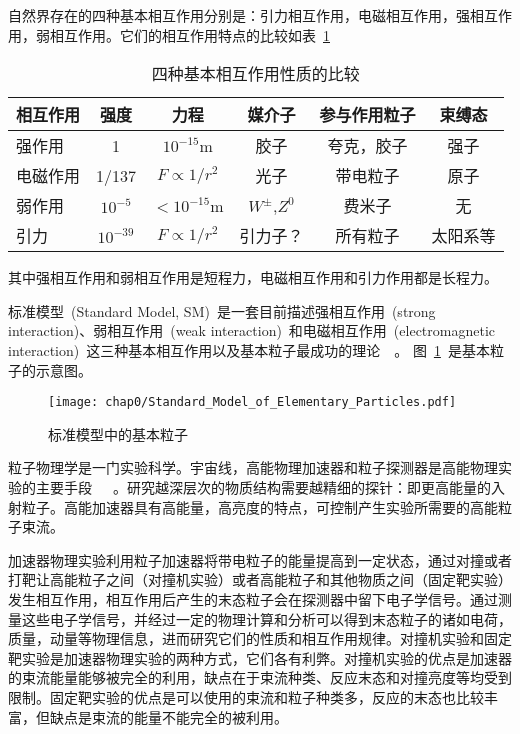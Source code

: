 自然界存在的四种基本相互作用分别是：引力相互作用，电磁相互作用，强相互作用，弱相互作用。它们的相互作用特点的比较如表~\ref{tbl:interaction}~

\begin{table}[h]
    \centering
    \caption{\label{tbl:interaction} 四种基本相互作用性质的比较}
    \footnotesize
    \begin{tabular}{lccccc}
        \hline
        相互作用& 强度& 力程& 媒介子& 参与作用粒子& 束缚态 \\
        \hline
        强作用& 1& $10^{-15}$m& 胶子& 夸克，胶子& 强子 \\
        电磁作用& 1/137& $F \propto 1/r^{2}$& 光子& 带电粒子& 原子 \\
        弱作用& $10^{-5}$& $<10^{-15}$m& $W^{\pm}$,$Z^{0}$& 费米子& 无 \\
        引力& $10^{-39}$&  $F \propto 1/r^{2}$& 引力子？& 所有粒子& 太阳系等\\
        \hline
    \end{tabular}
\end{table}

其中强相互作用和弱相互作用是短程力，电磁相互作用和引力作用都是长程力。


标准模型~(Standard Model, SM)~是一套目前描述强相互作用~(strong interaction)、弱相互作用~(weak interaction)~和电磁相互作用~(electromagnetic interaction)~这三种基本相互作用以及基本粒子最成功的理论~\cite{duds2015}~\cite{S.Weinberg:1967}。
图~\ref{fig:standard_model_particle}~是基本粒子的示意图。
\begin{figure}[!h]
  \centering
  \texttt{[image: chap0/Standard\_Model\_of\_Elementary\_Particles.pdf]}
  \caption{标准模型中的基本粒子}
  \label{fig:standard_model_particle}
\end{figure}

粒子物理学是一门实验科学。宇宙线，高能物理加速器和粒子探测器是高能物理实验的主要手段~\cite{tangxw1982}~\cite{xukz1981}~\cite{xieyg2003}\cite{xuefj2003}。研究越深层次的物质结构需要越精细的探针：即更高能量的入射粒子。高能加速器具有高能量，高亮度的特点，可控制产生实验所需要的高能粒子束流。

加速器物理实验利用粒子加速器将带电粒子的能量提高到一定状态，通过对撞或者打靶让高能粒子之间（对撞机实验）或者高能粒子和其他物质之间（固定靶实验）发生相互作用，相互作用后产生的末态粒子会在探测器中留下电子学信号。通过测量这些电子学信号，并经过一定的物理计算和分析可以得到末态粒子的诸如电荷，质量，动量等物理信息，进而研究它们的性质和相互作用规律。对撞机实验和固定靶实验是加速器物理实验的两种方式，它们各有利弊。对撞机实验的优点是加速器的束流能量能够被完全的利用，缺点在于束流种类、反应末态和对撞亮度等均受到限制。固定靶实验的优点是可以使用的束流和粒子种类多，反应的末态也比较丰富，但缺点是束流的能量不能完全的被利用。

